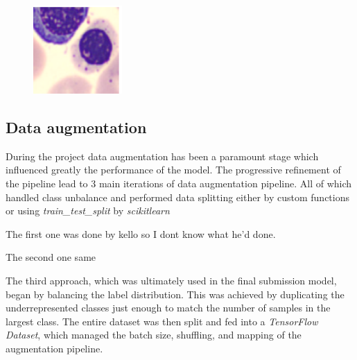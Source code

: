 \documentclass[11pt]{article}
\begin{document}
\begin{figure}[H]
\begin{minipage}{0.2\textwidth}
        \includegraphics[width=\linewidth]{images/ambiguous2.png}
    \end{minipage}
\end{figure}

\subsection{Data augmentation}

During the project data augmentation has been a paramount stage which influenced greatly the performance of the model. The progressive refinement of the pipeline lead to 3 main iterations of data augmentation pipeline.
All of which handled class unbalance and performed data splitting either by custom functions or using \textit{train\_test\_split} by \textit{scikit\-learn}

The first one was done by kello so I dont know what he'd done.

The second one same

The third approach, which was ultimately used in the final submission model, began by balancing the label distribution. This was achieved by duplicating the underrepresented classes just enough to match the number of samples in the largest class. The entire dataset was then split and fed into a \textit{TensorFlow Dataset}, which managed the batch size, shuffling, and mapping of the augmentation pipeline.
\end{document}
